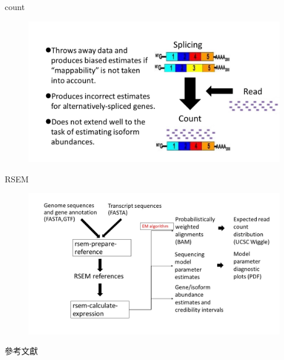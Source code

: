 \documentclass[12pt, aspectratio=43]{beamer}
\begin{document}
\begin{frame}{count}
	\begin{figure}[h!]
		\centering
		\includegraphics[width=\linewidth]{Figure/old_count.jpg}
	\end{figure}
\end{frame}

\begin{frame}{RSEM}
	\begin{figure}[h!]
		\centering
		\includegraphics[width=1.1\linewidth]{Figure/RSEM.jpg}
	\end{figure}
\end{frame}


\begin{frame}[allowframebreaks]{參考文獻}
    \printbibliography %
\end{frame}
\end{document}

